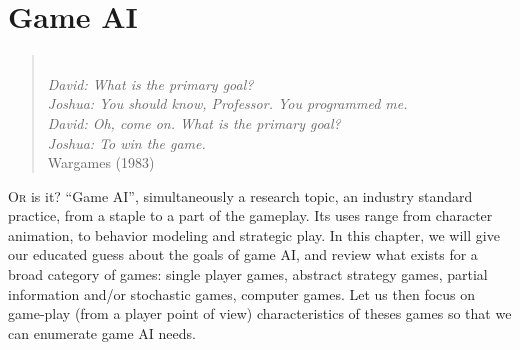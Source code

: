 \chapter{Game AI}

\begin{verse}\textit{
\\
David: What is the primary goal?\\
Joshua: You should know, Professor. You programmed me.\\
David: Oh, come on. What is the primary goal?\\
Joshua: To win the game.\\
} Wargames (1983)\end{verse}
\lettrine{O}{r}
 is it? ``Game AI'', simultaneously a research topic, an industry standard practice, from a staple to a part of the gameplay. Its uses range from character animation, to behavior modeling and strategic play. In this chapter, we will give our educated guess about the goals of game AI, and review what exists for a broad category of games: single player games, abstract strategy games, partial information and/or stochastic games, computer games. Let us then focus on game-play (from a player point of view) characteristics of theses games so that we can enumerate game AI needs. %

